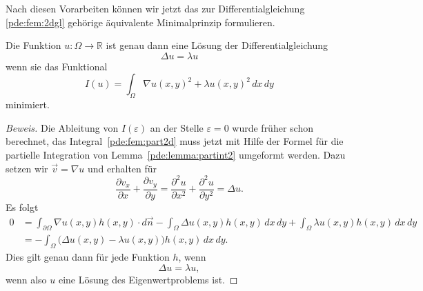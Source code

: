 Nach diesen Vorarbeiten können wir jetzt das zur Differentialgleichung
\eqref{pde:fem:2dgl} gehörige äquivalente Minimalprinzip formulieren.

\begin{satz}
Die Funktion $u\colon\Omega\to\mathbb R$ ist genau dann eine Lösung der
Differentialgleichung
\[
\Delta u =\lambda u
\]
wenn sie das Funktional
\[
I(u)
=
\int_{\Omega} \nabla u(x,y)^2 + \lambda u(x,y)^2 \,dx\,dy
\]
minimiert.
%
\end{satz}

\begin{proof}[Beweis]
Die Ableitung von $I(\varepsilon)$ an der Stelle $\varepsilon=0$
wurde früher schon berechnet, das Integral~\eqref{pde:fem:part2d}
muss jetzt mit Hilfe der Formel für die partielle Integration
von Lemma~\ref{pde:lemma:partint2} umgeformt werden.
Dazu setzen wir $\vec{v}=\nabla u$ und erhalten für
\[
\frac{\partial v_x}{\partial x}
+
\frac{\partial v_y}{\partial y}
=
\frac{\partial^2 u}{\partial x^2}
+
\frac{\partial^2 u}{\partial y^2}
=
\Delta u.
\]
Es folgt
\begin{align*}
0
&=
\int_{\partial\Omega} \nabla u(x,y) h(x,y) \cdot d\vec{n}
-
\int_{\Omega} \Delta u(x,y) h(x,y)\,dx\,dy
+
\int_{\Omega} \lambda u(x,y) h(x,y)\,dx\,dy
\\
&=
-
\int_{\Omega} \bigl(\Delta u(x,y)-\lambda u(x,y)\bigr) h(x,y)\,dx\,dy.
\end{align*}
Dies gilt genau dann für jede Funktion $h$, wenn
\[
\Delta u = \lambda u,
\]
wenn also $u$ eine Lösung des Eigenwertproblems ist.
%
\end{proof}






